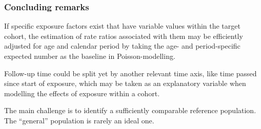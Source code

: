 \documentclass[handout,12pt]{beamer}
\begin{document}
\begin{frame} 
\frametitle{Concluding remarks} 

\bi
\item
If specific exposure factors exist that have variable values within
the target cohort, the estimation of rate ratios associated with them
 may be efficiently adjusted for age and calendar period by taking the 
 age- and period-specific expected number as the baseline in Poisson-modelling.
 \medskip
 \item
Follow-up time could be split yet by another relevant time axis, 
like time passed since start of exposure, which may be taken as an explanatory variable when modelling the effects of exposure within a cohort.
\medskip
\item
The main challenge is to identify a sufficiently 
comparable reference population. The ``general'' population is rarely an ideal one. 
\ei
\end{frame}
\end{document}
